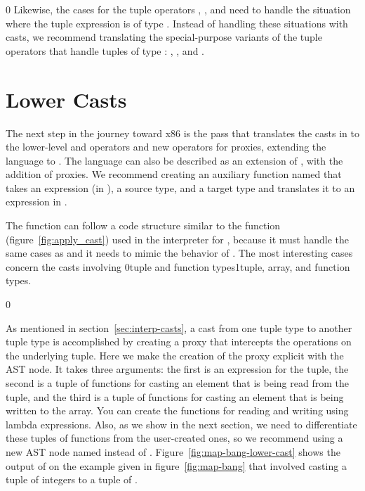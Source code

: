 \documentclass[7x10]{TimesAPriori_MIT}%
\def\racketEd{0}
\def\pythonEd{1}
\providecommand{\BookEdition}{1}
\let\edition\BookEdition
\newcommand{\racket}[1]{{\if\edition\racketEd{#1}\fi}}
\newcommand{\pythonColor}[0]{}
\newcommand{\python}[1]{{\if\edition\pythonEd\pythonColor #1\fi}}
\numberwithin{theorem}{chapter}
\numberwithin{definition}{chapter}
\numberwithin{equation}{chapter}
\begin{document}
{\if\edition\racketEd
%  
Likewise, the cases for the tuple operators ,
, and  need to handle the situation
where the tuple expression is of type \CANYTY{}. Instead of
handling these situations with casts, we recommend translating
the special-purpose variants of the tuple operators that handle
tuples of type \CANYTY{}: ,
, and .
%
\fi}


\section{Lower Casts }
\label{sec:lower_casts}

The next step in the journey toward x86 is the 
pass that translates the casts in \LangCast{} to the lower-level
 and  operators and new operators for
proxies, extending the \LangLam{} language to \LangProxy{}.
The \LangProxy{} language can also be described as an extension of
\LangAny{}, with the addition of proxies. We recommend creating an
auxiliary function named  that takes an expression
(in \LangCast{}), a source type, and a target type and translates it
to an expression in \LangProxy{}.

The  function can follow a code structure similar to
the  function (figure~\ref{fig:apply_cast}) used in
the interpreter for \LangCast{}, because it must handle the same cases
as  and it needs to mimic the behavior of
. The most interesting cases concern
the casts involving \racket{tuple and function types}\python{tuple, array, and function types}.


{\if\edition\racketEd

As mentioned in section~\ref{sec:interp-casts}, a cast from one tuple
type to another tuple type is accomplished by creating a proxy that
intercepts the operations on the underlying tuple. Here we make the
creation of the proxy explicit with the  AST
node. It takes three arguments: the first is an expression for the
tuple, the second is a tuple of functions for casting an element that is
being read from the tuple, and the third is a tuple of functions for
casting an element that is being written to the array.  You can create
the functions for reading and writing using lambda expressions.  Also,
as we show in the next section, we need to differentiate these tuples
of functions from the user-created ones, so we recommend using a new
AST node named  instead of .
%
Figure~\ref{fig:map-bang-lower-cast} shows the output of
 on the example given in figure~\ref{fig:map-bang}
that involved casting a tuple of integers to a tuple of \CANYTY{}.

\fi}
\end{document}
